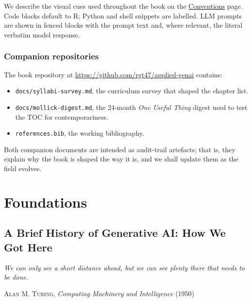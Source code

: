 \documentclass[
  letterpaper,
  11pt]{scrbook}
\providecommand{\tightlist}{%
  \setlength{\itemsep}{0pt}\setlength{\parskip}{0pt}}
\begin{document}

We describe the visual cues used throughout the book on the
\hyperref[conventions]{Conventions} page. Code blocks default to R;
Python and shell snippets are labelled. LLM prompts are shown in fenced
blocks with the prompt text and, where relevant, the literal verbatim
model response.

\section*{Companion repositories}\label{companion-repositories}


The book repository at \url{https://github.com/rgt47/applied-genai}
contains:

\begin{itemize}
\tightlist
\item
  \texttt{docs/syllabi-survey.md}, the curriculum survey that shaped the
  chapter list.
\item
  \texttt{docs/mollick-digest.md}, the 24-month \emph{One Useful Thing}
  digest used to test the TOC for contemporariness.
\item
  \texttt{references.bib}, the working bibliography.
\end{itemize}

Both companion documents are intended as audit-trail artefacts; that is,
they explain why the book is shaped the way it is, and we shall update
them as the field evolves.

\part{Foundations}

\chapter{A Brief History of Generative AI: How We Got
Here}\label{sec-genesis}

\begin{flushright}\small

\emph{We can only see a short distance ahead, but we can see plenty
there that needs to be done.}

\textsc{Alan M. Turing}, \emph{Computing Machinery and Intelligence}
(1950)

\end{flushright}
\end{document}
